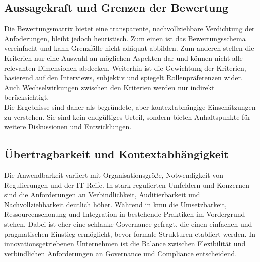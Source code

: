 \subsection{Aussagekraft und Grenzen der Bewertung}
Die Bewertungsmatrix bietet eine transparente, nachvollziehbare Verdichtung der Anfoderungen, bleibt jedoch heuristisch.
Zum einen ist das Bewertungsschema vereinfacht und kann Grenzfälle nicht adäquat abbilden.
Zum anderen stellen die Kriterien nur eine Auswahl an möglichen Aspekten dar und können nicht alle relevanten Dimensionen abdecken.
Weiterhin ist die Gewichtung der Kriterien, basierend auf den Interviews, subjektiv und spiegelt Rollenpräferenzen wider.
Auch Wechselwirkungen zwischen den Kriterien werden nur indirekt berücksichtigt.
\\
Die Ergebnisse sind daher als begründete, aber kontextabhängige Einschätzungen zu verstehen.
Sie sind kein endgültiges Urteil, sondern bieten Anhaltspunkte für weitere Diskussionen und Entwicklungen.

\subsection{Übertragbarkeit und Kontextabhängigkeit}
Die Anwendbarkeit variiert mit Organisationsgröße, Notwendigkeit von Regulierungen und der IT-Reife.
In stark regulierten Umfeldern und Konzernen sind die Anforderungen an Verbindlichkeit, Auditierbarkeit und Nachvollziehbarkeit deutlich höher.
Während in \ac{kmu} die Umsetzbarkeit, Ressourcenschonung und Integration in bestehende Praktiken im Vordergrund stehen.
Dabei ist eher eine schlanke Governance gefragt, die einen einfachen und pragmatischen Einstieg ermöglicht, bevor formale Strukturen etabliert werden.
In innovationsgetriebenen Unternehmen ist die Balance zwischen Flexibilität und verbindlichen Anforderungen an Governance und Compliance entscheidend.